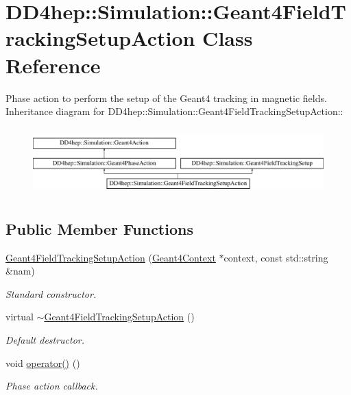 \hypertarget{class_d_d4hep_1_1_simulation_1_1_geant4_field_tracking_setup_action}{
\section{DD4hep::Simulation::Geant4FieldTrackingSetupAction Class Reference}
\label{class_d_d4hep_1_1_simulation_1_1_geant4_field_tracking_setup_action}
}


Phase action to perform the setup of the Geant4 tracking in magnetic fields.  
Inheritance diagram for DD4hep::Simulation::Geant4FieldTrackingSetupAction::\begin{figure}[H]
\begin{center}
\leavevmode
\includegraphics[height=2.625cm]{class_d_d4hep_1_1_simulation_1_1_geant4_field_tracking_setup_action}
\end{center}
\end{figure}
\subsection*{Public Member Functions}
\begin{DoxyCompactItemize}
\item 
\hyperlink{class_d_d4hep_1_1_simulation_1_1_geant4_field_tracking_setup_action_a921208adb94ef397bd208a75a8654dcc}{Geant4FieldTrackingSetupAction} (\hyperlink{class_d_d4hep_1_1_simulation_1_1_geant4_context}{Geant4Context} $\ast$context, const std::string \&nam)
\begin{DoxyCompactList}\small\item\em Standard constructor. \item\end{DoxyCompactList}\item 
virtual \hyperlink{class_d_d4hep_1_1_simulation_1_1_geant4_field_tracking_setup_action_aec9b4efefc6cce22342b63fd91a5ef8b}{$\sim$Geant4FieldTrackingSetupAction} ()
\begin{DoxyCompactList}\small\item\em Default destructor. \item\end{DoxyCompactList}\item 
void \hyperlink{class_d_d4hep_1_1_simulation_1_1_geant4_field_tracking_setup_action_a5412b262d35a196e35807b2a3fe2463b}{operator()} ()
\begin{DoxyCompactList}\small\item\em Phase action callback. \item\end{DoxyCompactList}\end{DoxyCompactItemize}


